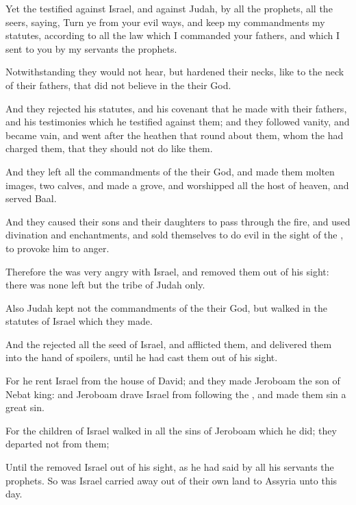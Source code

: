 {Yet the
{}
testified against
Israel, and against
Judah,
by all the
prophets,
{} all the
seers,
saying,
Turn ye from your
evil
ways, and
keep my
commandments
{} my
statutes, according to all the
law which I
commanded your
fathers, and which I
sent to you
by my
servants the
prophets.

Notwithstanding they would not
hear, but
hardened their
necks, like to the
neck of their
fathers, that did not
believe in the
{} their
God.

And they
rejected his
statutes, and his
covenant that he
made with their
fathers, and his
testimonies which he
testified against them; and they
followed
vanity, and became
vain, and went
after the
heathen that
{} round
about them,
{} whom the
{} had
charged them, that they should not
do like them.

And they
left all the
commandments of the
{} their
God, and
made them molten
images,
{}
two
calves, and
made a
grove, and
worshipped all the
host of
heaven, and
served
Baal.

And they caused their
sons and their
daughters to
pass through the
fire, and
used
divination and
enchantments, and
sold themselves to
do
evil in the
sight of the
{}, to provoke him to
anger.

Therefore the
{} was
very
angry with
Israel, and
removed them out of his
sight: there was none
left but the
tribe of
Judah only.

Also
Judah
kept not the
commandments of the
{} their
God, but
walked in the
statutes of
Israel which they
made.

And the
{}
rejected all the
seed of
Israel, and
afflicted them, and
delivered them into the
hand of
spoilers, until he had
cast them out of his
sight.

For he
rent
Israel from the
house of
David; and they made
Jeroboam the
son of
Nebat
king: and
Jeroboam
drave
Israel from
following the
{}, and made them
sin a
great
sin.

For the
children of
Israel
walked in all the
sins of
Jeroboam which he
did; they
departed not from them;

Until the
{}
removed
Israel out of his
sight, as he had
said
by all his
servants the
prophets. So was
Israel carried
away out of their own
land to
Assyria unto this
day.


}
